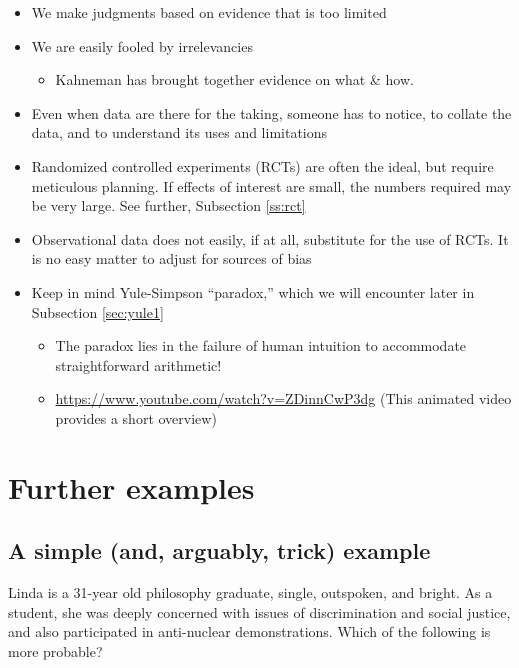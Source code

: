 \documentclass[
  10pt,
  b5paper]{book}
\providecommand{\tightlist}{%
  \setlength{\itemsep}{0pt}\setlength{\parskip}{0pt}}
\begin{document}
\begin{itemize}
\tightlist
\item
  We make judgments based on evidence that is too limited
\item
  We are easily fooled by irrelevancies

  \begin{itemize}
  \tightlist
  \item
    Kahneman has brought together evidence on what \& how.
  \end{itemize}
\item
  Even when data are there for the taking, someone has
  to notice, to collate the data, and to understand its uses
  and limitations
\item
  Randomized controlled experiments (RCTs) are often the ideal, but
  require meticulous planning. If effects of interest are small,
  the numbers required may be very large. See further,
  Subsection \ref{ss:rct}
\item
  Observational data does not easily, if at all, substitute for
  the use of RCTs. It is no easy matter to adjust for sources
  of bias
\item
  Keep in mind Yule-Simpson ``paradox,'' which we will encounter
  later in Subsection \ref{sec:yule1}

  \begin{itemize}
  \tightlist
  \item
    The paradox lies in the failure of human intuition to
    accommodate straightforward arithmetic!
  \item
    \url{https://www.youtube.com/watch?v=ZDinnCwP3dg}
    (This animated video provides a short overview)
  \end{itemize}
\end{itemize}

\hypertarget{further-examples}{%
\section{Further examples}\label{further-examples}}

\hypertarget{a-simple-and-arguably-trick-example}{%
\subsection*{A simple (and, arguably, trick) example}\label{a-simple-and-arguably-trick-example}}

Linda is a 31-year old philosophy graduate, single,
outspoken, and bright. As a student, she was deeply
concerned with issues of discrimination and social
justice, and also participated in anti-nuclear
demonstrations. Which of the following is more probable?
\end{document}

